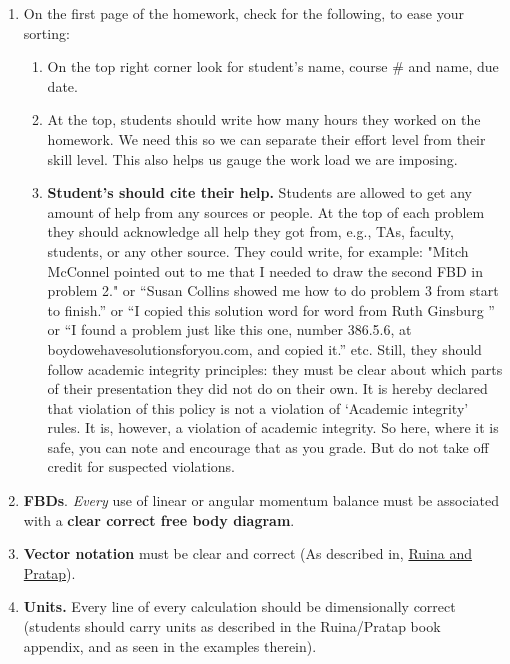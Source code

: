 \documentclass[11pt]{article}
\begin{document}
\begin{enumerate}
\begin{enumerate}
\item  On the first page of the homework, check for the following, to ease your sorting:
\begin{enumerate}
 \item  	 On the top right corner  look for student's name, course \# and name, due date. 
 
 \item At the top,  students  should write how many hours they worked on the homework. We need this so we can separate  their effort level from their skill level. This also helps us gauge the work load we are imposing. 
 

 

 


 
 

\item \textbf{Student's should cite their  help.} Students are allowed to get any amount of help from any sources or people. At the top of each problem they should acknowledge all help they  got from, e.g.,  TAs, faculty, students, or any other source. They  could write, for example: "Mitch McConnel pointed out to me that I needed to draw the second FBD in problem 2." or ``Susan Collins showed me how to do problem 3 from start to finish.'' or ``I copied this solution word for word from Ruth Ginsburg '' or ``I found a problem just like this one, number 386.5.6, at boydowehavesolutionsforyou.com, and copied it.'' etc.  Still, they should follow academic integrity principles:  they must be clear about which parts of their presentation they did not do on their own.  It is hereby declared that violation of this policy is not a violation of `Academic integrity' rules.
It is, however, a violation of academic integrity.  So here, where it is safe, you can note and encourage that as you grade.  But do not take off credit for suspected violations. 
 \end{enumerate}

\item  \textbf{FBDs}. \textit{Every} use of linear or angular momentum balance must be associated with a \textbf{clear correct free body diagram}.

\item \textbf{Vector notation} must be clear and correct (As described in, \eg \href{http://http://ruina.tam.cornell.edu/Book/index.html}{\color{blue}Ruina and Pratap}).

\item  \textbf{Units.} Every line of every calculation should be dimensionally correct (students should carry units as described in the  Ruina/Pratap book appendix, and as seen in the examples therein).


\end{enumerate}
\end{enumerate}
\end{document}
